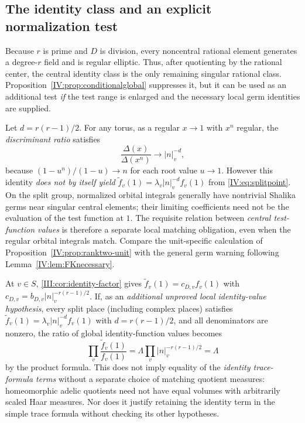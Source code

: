 \subsection{The identity class and an explicit normalization test}
\label{IV:subsec:identity-test}
Because $r$ is prime and $D$ is division, every noncentral
rational element generates a degree-$r$ field and is regular
elliptic.  Thus, after quotienting by the rational center, the
central identity class is the only remaining singular rational
class.  Proposition~\ref{IV:prop:conditionalglobal} suppresses it,
but it can be used as an additional test \emph{if} the test range
is enlarged and the necessary local germ identities are supplied.
\begin{remark}
\label{IV:rem:identity-germs}
Let $d=r(r-1)/2$.  For any torus, as a regular $x\to1$
with $x^n$ regular, the \emph{discriminant ratio} satisfies
\[
 \frac{\Delta(x)}{\Delta(x^n)}\longrightarrow |n|_v^{-d},
\]
because $(1-u^n)/(1-u)\to n$ for each root value $u\to1$.
However this identity \emph{does not by itself yield}
$\widetilde f_v(1)=\lambda_v|n|_v^{-d}f_v(1)$
from \eqref{IV:eq:splitpoint}.  On the split group, normalized
orbital integrals generally have nontrivial Shalika germs near
singular central elements; their limiting coefficients need not
be the evaluation of the test function at $1$.  The requisite
relation between \emph{central test-function values} is therefore
a separate local matching obligation, even when the regular
orbital integrals match.  Compare the unit-specific calculation
of Proposition~\ref{IV:prop:ranktwo-unit} with the general
germ warning following Lemma~\ref{IV:lem:FKnecessary}.
\end{remark}

At $v\in S$, \cref{III:cor:identity-factor} gives
$\widetilde f_v(1)=c_{D,v}f_v(1)$ with
$c_{D,v}=b_{D,v}|n|_v^{-r(r-1)/2}$.  If, as an \emph{additional unproved local identity-value
hypothesis}, every split place (including complex places) satisfies
$\widetilde f_v(1)=\lambda_v|n|_v^{-d}f_v(1)$ with
$d=r(r-1)/2$, and all denominators are nonzero, the ratio of
global identity-function values becomes
\begin{equation}\label{IV:eq:identityproduct}
 \prod_v\frac{\widetilde f_v(1)}{f_v(1)}
   =\Lambda\prod_v|n|_v^{-r(r-1)/2}
   =\Lambda
\end{equation}
by the product formula.  This does not imply equality of the
\emph{identity trace-formula terms} without a separate choice of
matching quotient measures: homeomorphic adelic quotients need
not have equal volumes with arbitrarily scaled Haar measures.
Nor does it justify retaining the identity term in the simple
trace formula without checking its other hypotheses.

